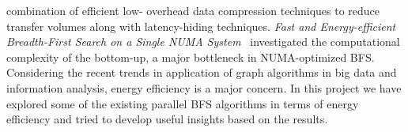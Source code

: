 combination of efficient low- overhead data compression techniques to
reduce transfer volumes along with latency-hiding techniques.\newline
\emph{Fast and Energy-efficient Breadth-First Search on a Single NUMA
System}~\cite{ENERGY-BFS} investigated the computational complexity of the
bottom-up, a major bottleneck in NUMA-optimized BFS.\newline
Considering the recent trends in application of graph algorithms in
big data and information analysis, energy efficiency is a major
concern. In this project we have explored some of the existing
parallel BFS algorithms in terms of energy efficiency and tried to
develop useful insights based on the results.
